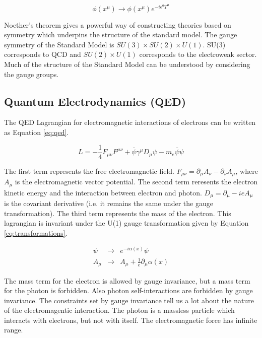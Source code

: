\begin{equation} 
\phi(x^{\mu})\rightarrow \phi(x^{\mu})e^{-i\epsilon^{a}T^{a}}
\label{eq:gauge}
\end{equation}

Noether's theorem gives a powerful way of constructing theories based on 
symmetry which underpins the structure of the standard model. The gauge
symmetry of the Standard Model is $SU(3)\times SU(2)\times U(1)$. SU(3) 
corresponds to QCD and $SU(2)\times U(1)$ corresponds to the electroweak
sector. Much of the structure of the Standard Model can be understood by 
considering the gauge groups.

\subsection{Quantum Electrodynamics (QED)}

The QED Lagrangian for electromagnetic interactions of electrons can be written 
as Equation \ref{eq:qed}.

\begin{equation}
L = -\frac{1}{4}F_{\mu\nu}F^{\mu\nu} + \bar{\psi}\gamma^{\mu}D_{\mu}\psi
- m_{e}\bar{\psi}\psi
\label{eq:qed}
\end{equation} 

The first term represents the free electromagnetic field. $F_{\mu\nu} = 
\partial_{\mu}A_{\nu} - \partial_{\nu}A_{\mu}$, where $A_{\mu}$ is the 
electromagnetic vector potential. The second term reresents the electron kinetic 
energy and the interaction between electron and photon. $D_{\mu} = 
\partial_{\mu} - ieA_{\mu}$ is the covariant derivative (i.e. it remains the 
same under the gauge transformation). The third term represents the mass of the 
electron. This lagrangian is invariant under the U(1) gauge transformation given 
by Equation \ref{eq:transformations}.

\begin{eqnarray}
\psi &\rightarrow& e^{-i\alpha(x)}\psi \\
A_{\mu}   &\rightarrow& A_{\mu} + \frac{1}{e}\partial_{\mu}\alpha(x)
\label{eq:transformations}
\end{eqnarray}

The mass term for the electron is allowed by gauge invariance, but a mass term for 
the photon is forbidden. Also photon self-interactions are forbidden by gauge 
invariance. The constraints set by gauge invariance tell us a lot about the
nature of the electromagentic interaction. The photon is a massless particle which 
interacts with electrons, but not with itself. The electromagnetic force has 
infinite range. \\

